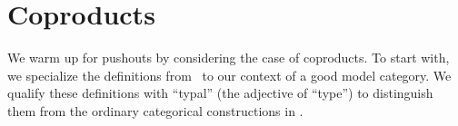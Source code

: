 \documentclass{amsart}
\let\sec\S
\let\S\cS
\begin{document}





\section{Coproducts}
\label{sec:coproducts}

We warm up for pushouts by considering the case of coproducts.
To start with, we specialize the definitions from~\cite[\sec3.4.1]{lw:localuniv} to our context of a good model category.
We qualify these definitions with ``typal'' (the adjective of ``type'') to distinguish them from the ordinary categorical constructions in \sM.
\end{document}
